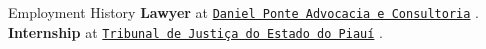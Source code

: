 \begin{rubric}{Employment History}
%
	\textbf{Lawyer} at {\href{http://danielponte.com.br/}{\texttt{Daniel Ponte Advocacia e Consultoria}}} .
%
%
\entry*[2020 -- 2021]%
	\textbf{Internship} at {\href{https://www.tjpi.jus.br/portaltjpi/}{\texttt{Tribunal de Justiça do Estado do Piauí}}} .
%
\end{rubric}
